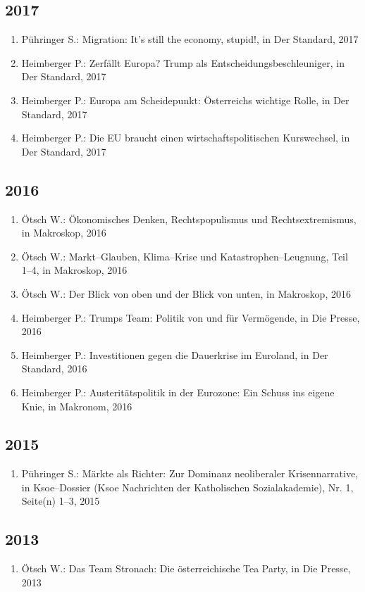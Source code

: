 \subsection*{2017}
\begin{enumerate}
    	 \item Pühringer S.: Migration: It's still the economy, stupid!, in Der Standard, 2017
	 \item Heimberger P.: Zerfällt Europa? Trump als Entscheidungsbeschleuniger, in Der Standard, 2017
	 \item Heimberger P.: Europa am Scheidepunkt: Österreichs wichtige Rolle, in Der Standard, 2017
	 \item Heimberger P.: Die EU braucht einen wirtschaftspolitischen Kurswechsel, in Der Standard, 2017
\end{enumerate}
\subsection*{2016}
\begin{enumerate}
    	 \item Ötsch W.: Ökonomisches Denken, Rechtspopulismus und Rechtsextremismus, in Makroskop, 2016
	 \item Ötsch W.: Markt--Glauben, Klima--Krise und Katastrophen--Leugnung, Teil 1--4, in Makroskop, 2016
	 \item Ötsch W.: Der Blick von oben und der Blick von unten, in Makroskop, 2016
	 \item Heimberger P.: Trumps Team: Politik von und für Vermögende, in Die Presse, 2016
	 \item Heimberger P.: Investitionen gegen die Dauerkrise im Euroland, in Der Standard, 2016
	 \item Heimberger P.: Austeritätspolitik in der Eurozone: Ein Schuss ins eigene Knie, in Makronom, 2016
\end{enumerate}
\subsection*{2015}
\begin{enumerate}
    	 \item Pühringer S.: Märkte als Richter: Zur Dominanz neoliberaler Krisennarrative, in Ksoe--Dossier (Ksoe Nachrichten der Katholischen Sozialakademie), Nr. 1, Seite(n) 1--3, 2015
\end{enumerate}
\subsection*{2013}
\begin{enumerate}
    	 \item Ötsch W.: Das Team Stronach: Die österreichische Tea Party, in Die Presse, 2013
\end{enumerate}
